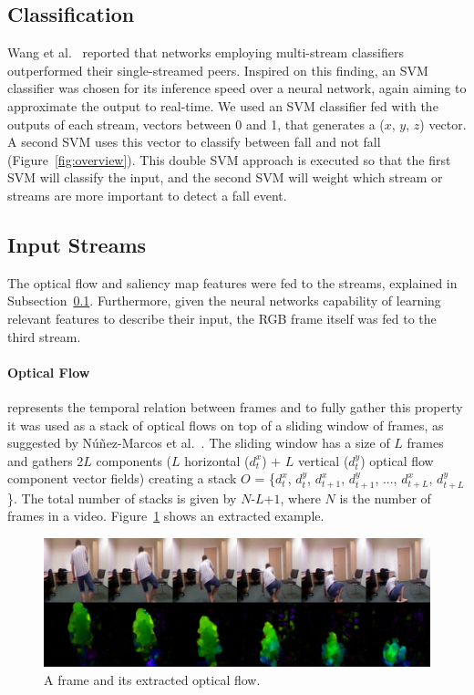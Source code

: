 \documentclass[10pt, conference, compsocconf]{IEEEtran}
\begin{document}
\subsection{Classification}
\label{sec:classification}

Wang et al.~\cite{wang2015towards} reported that networks employing multi-stream classifiers outperformed their single-streamed peers. Inspired on this finding, an SVM classifier was chosen for its inference speed over a neural network, again aiming to approximate the output to real-time. We used an SVM classifier fed with the outputs of each stream, vectors between 0 and 1, that generates a ($x$, $y$, $z$) vector. A second SVM uses this vector to classify between fall and not fall (Figure~\ref{fig:overview}). This double SVM approach is executed so that the first SVM will classify the input, and the second SVM will weight which stream or streams are more important to detect a fall event.

\subsection{Input Streams}

The optical flow and saliency map features were fed to the streams, explained in Subsection~\ref{sec:classification}. Furthermore, given the neural networks capability of learning relevant features to describe their input, the RGB frame itself was fed to the third stream.

\paragraph{Optical Flow} represents the temporal relation between frames and to fully gather this property it was used as a stack of optical flows on top of a sliding window of frames, as suggested by N\'u\~nez-Marcos et al.~\cite{nunez2017vision}. The sliding window has a size of $L$ frames and gathers 2$L$ components ($L$ horizontal ($d_t^x$) + $L$ vertical ($d_t^y$) optical flow component vector fields) creating a stack $O$ = \{$d_t^x$, $d_t^y$, $d_{t+1}^x$, $d_{t+1}^y$, ..., $d_{t+L}^x$, $d_{t+L}^y$\}. The total number of stacks is given by $N$-$L$+$1$, where $N$ is the number of frames in a video. Figure~\ref{fig:of} shows an extracted example.

\begin{figure}[!htb]
\centerline{\includegraphics[width=\linewidth]{figures/of.png}}
\caption{A frame and its extracted optical flow.}
\label{fig:of}
\end{figure}
\end{document}
